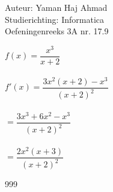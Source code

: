 \documentclass[a4paper]{article}
\begin{document}
\noindent \large Auteur: Yaman Haj Ahmad \\
\noindent \large Studierichting: Informatica\\
\noindent \large Oefeningenreeks 3A nr. 17.9\\

\medskip

\normalsize

$f(x) = \dfrac{x^3}{x + 2}$\\\\

$f'(x) = \dfrac{3x^2\left(x+2\right)-x^3}{\left(x+2\right)^2}$\\\\

$= \dfrac{3x^3 + 6x^2 - x^3}{\left(x+2\right)^2}$\\\\

$= \dfrac{2x^2\left(x+3\right)}{\left(x+2\right)^2}$


\begin{thebibliography}{999}
\end{thebibliography}
\end{document}
